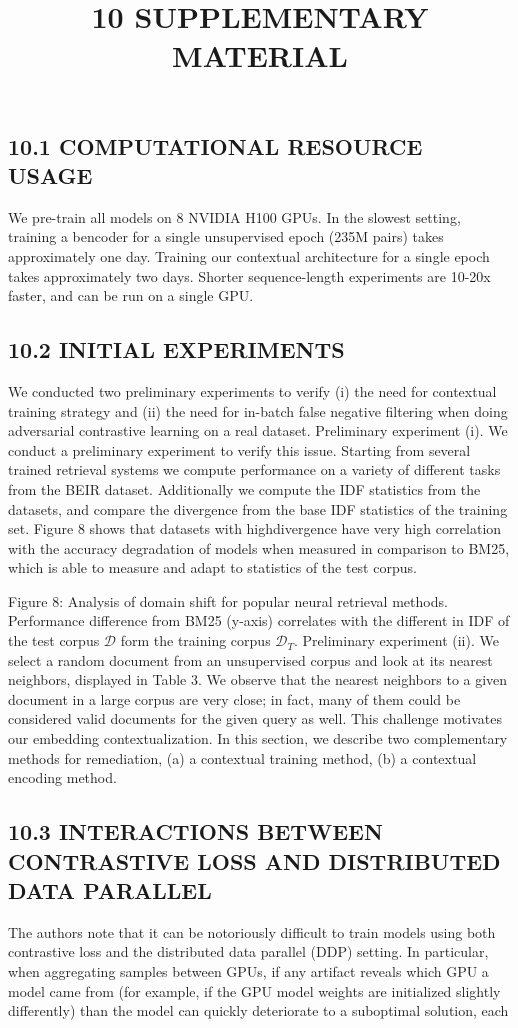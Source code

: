 \title{
10 SUPPLEMENTARY MATERIAL
}
\subsection*{10.1 COMPUTATIONAL RESOURCE USAGE}
We pre-train all models on 8 NVIDIA H100 GPUs. In the slowest setting, training a bencoder for a single unsupervised epoch (235M pairs) takes approximately one day. Training our contextual architecture for a single epoch takes approximately two days. Shorter sequence-length experiments are 10-20x faster, and can be run on a single GPU.
\subsection*{10.2 INITIAL EXPERIMENTS}
We conducted two preliminary experiments to verify (i) the need for contextual training strategy and (ii) the need for in-batch false negative filtering when doing adversarial contrastive learning on a real dataset.
Preliminary experiment (i). We conduct a preliminary experiment to verify this issue. Starting from several trained retrieval systems we compute performance on a variety of different tasks from the BEIR dataset. Additionally we compute the IDF statistics from the datasets, and compare the divergence from the base IDF statistics of the training set. Figure 8 shows that datasets with highdivergence have very high correlation with the accuracy degradation of models when measured in comparison to BM25, which is able to measure and adapt to statistics of the test corpus.

Figure 8: Analysis of domain shift for popular neural retrieval methods. Performance difference from BM25 (y-axis) correlates with the different in IDF of the test corpus \(\mathcal{D}\) form the training corpus \(\mathcal{D}_{T}\).
Preliminary experiment (ii). We select a random document from an unsupervised corpus and look at its nearest neighbors, displayed in Table 3. We observe that the nearest neighbors to a given document in a large corpus are very close; in fact, many of them could be considered valid documents for the given query as well.
This challenge motivates our embedding contextualization. In this section, we describe two complementary methods for remediation, (a) a contextual training method, (b) a contextual encoding method.
\subsection*{10.3 INTERACTIONS BETWEEN CONTRASTIVE LOSS AND DISTRIBUTED DATA PARALLEL}
The authors note that it can be notoriously difficult to train models using both contrastive loss and the distributed data parallel (DDP) setting. In particular, when aggregating samples between GPUs, if any artifact reveals which GPU a model came from (for example, if the GPU model weights are initialized slightly differently) than the model can quickly deteriorate to a suboptimal solution, each

